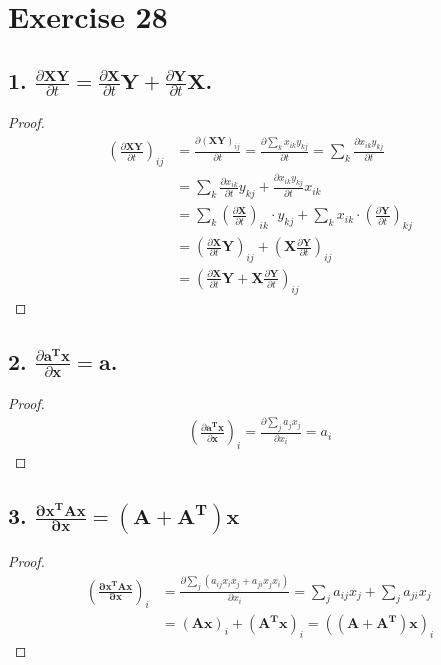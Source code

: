 \documentclass{article}
\begin{document}
\section{Exercise 28}
\subsection{1. $\frac{\partial\mathbf{XY}}{\partial t} = \frac{\partial \mathbf{X}}{\partial t}\mathbf{Y} + \frac{\partial \mathbf{Y}}{\partial t}\mathbf{X}$.}
\begin{proof}
\begin{align*}
    (\frac{\partial\mathbf{XY}}{\partial t})_{ij} &=  \frac{\partial(\mathbf{XY})_{ij}}{\partial t}
    =  \frac{\partial \sum_{k}x_{ik}y_{kj}}{\partial t}
    =  \sum_{k} \frac{\partial x_{ik}y_{kj}}{\partial t} \\
    &=  \sum_{k} \frac{\partial x_{ik}}{\partial t}y_{kj}  + \frac{\partial x_{ik}y_{kj}}{\partial t}x_{ik}\\
    &= \sum_{k} (\frac{\partial \mathbf X}{\partial t})_{ik}\cdot y_{kj} + \sum_{k} x_{ik}\cdot(\frac{\partial \mathbf Y}{\partial t})_{kj}\\
    &= (\frac{\partial \mathbf X}{\partial t}\mathbf Y)_{ij} + (\mathbf X \frac{\partial \mathbf Y}{\partial t})_{ij}\\
    &= (\frac{\partial \mathbf X}{\partial t}\mathbf Y+\mathbf X \frac{\partial \mathbf Y}{\partial t})_{ij}
\end{align*}
\end{proof}

\subsection{2. $\frac{\partial \mathbf{a^Tx}}{\partial \mathbf x} = \mathbf a$.}
\begin{proof}
\begin{align*}
    (\frac{\partial \mathbf{a^Tx}}{\partial \mathbf x})_{i} = 
    \frac{\partial\sum_j a_jx_j}{\partial x_i} = a_i
\end{align*}
\end{proof}

\subsection{3. $\mathbf{\frac{\partial x^TAx}{\partial x} = (A+A^T)x}$}
\begin{proof}
\begin{align*}
    (\mathbf{\frac{\partial x^TAx}{\partial x}})_{i} &= 
   \frac{\partial\sum_j (a_{ij} x_ix_j + a_{ji} x_jx_i)}{\partial x_i} = \sum_j a_{ij}x_j + \sum_j a_{ji}x_j \\
   &= (\mathbf{Ax})_i + (\mathbf{A^Tx})_i
   = (\mathbf{(A+A^T)x})_i
\end{align*}
\end{proof}
\end{document}

